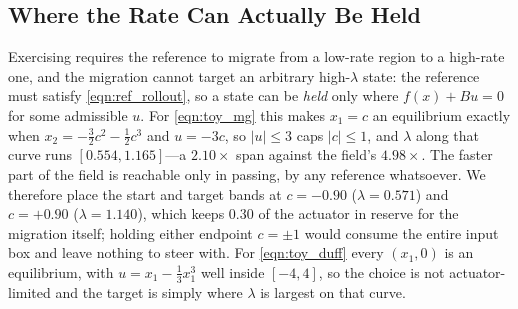 \documentclass[lettersize,journal]{IEEEtran}
\begin{document}
\subsection{Where the Rate Can Actually Be Held}
Exercising  requires the reference to migrate from a
low-rate region to a high-rate one, and the migration cannot target an arbitrary
high-$\lambda$ state: the reference must satisfy
\eqref{eqn:ref_rollout}, so a state can be \emph{held} only where
$f(x) + Bu = 0$ for some admissible $u$. For \eqref{eqn:toy_mg} this makes
$x_1 = c$ an equilibrium exactly when
$x_2 = -\tfrac{3}{2}c^2 - \tfrac{1}{2}c^3$ and $u = -3c$, so
$|u| \le 3$ caps $|c| \le 1$, and $\lambda$ along that curve runs
$[0.554, 1.165]$---a $2.10\times$ span against the field's $4.98\times$. The
faster part of the field is reachable only in passing, by any reference
whatsoever. We therefore place the start and target bands at $c = -0.90$
($\lambda = 0.571$) and $c = +0.90$ ($\lambda = 1.140$), which keeps $0.30$ of
the actuator in reserve for the migration itself; holding either endpoint
$c = \pm 1$ would consume the entire input box and leave nothing to steer with.
For \eqref{eqn:toy_duff} every $(x_1, 0)$ is an equilibrium, with
$u = x_1 - \tfrac{1}{3}x_1^3$ well inside $[-4, 4]$, so the choice is not
actuator-limited and the target is simply where $\lambda$ is largest on that
curve.





\end{document}
